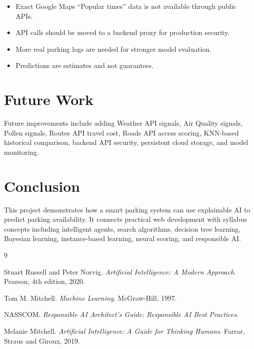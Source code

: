 \documentclass[12pt,a4paper]{article}
\begin{document}
\begin{itemize}
  \item Exact Google Maps \enquote{Popular times} data is not available through public APIs.
  \item API calls should be moved to a backend proxy for production security.
  \item More real parking logs are needed for stronger model evaluation.
  \item Predictions are estimates and not guarantees.
\end{itemize}

\section{Future Work}
\label{sec:future-work}

Future improvements include adding Weather API signals, Air Quality signals, Pollen signals, Routes API travel cost, Roads API access scoring, KNN-based historical comparison, backend API security, persistent cloud storage, and model monitoring.

\section{Conclusion}
\label{sec:conclusion}

This project demonstrates how a smart parking system can use explainable AI to predict parking availability. It connects practical web development with syllabus concepts including intelligent agents, search algorithms, decision tree learning, Bayesian learning, instance-based learning, neural scoring, and responsible AI.

\begin{thebibliography}{9}

Stuart Russell and Peter Norvig.
\textit{Artificial Intelligence: A Modern Approach}.
Pearson, 4th edition, 2020.

Tom M. Mitchell.
\textit{Machine Learning}.
McGraw-Hill, 1997.

NASSCOM.
\textit{Responsible AI Architect's Guide: Responsible AI Best Practices}.

Melanie Mitchell.
\textit{Artificial Intelligence: A Guide for Thinking Humans}.
Farrar, Straus and Giroux, 2019.

\end{thebibliography}
\end{document}
